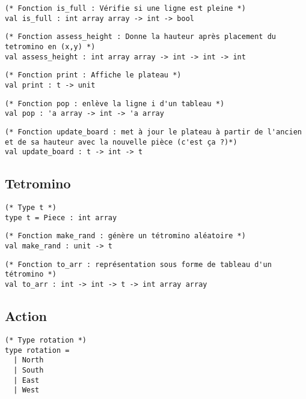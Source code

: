 \documentclass{article}
\begin{document}
\begin{lstlisting}[frame=L]
(* Fonction is_full : Vérifie si une ligne est pleine *)
val is_full : int array array -> int -> bool
\end{lstlisting}

\begin{lstlisting}[frame=L]
(* Fonction assess_height : Donne la hauteur après placement du tetromino en (x,y) *)
val assess_height : int array array -> int -> int -> int
\end{lstlisting}

\begin{lstlisting}[frame=L]
(* Fonction print : Affiche le plateau *)
val print : t -> unit
\end{lstlisting}

\begin{lstlisting}[frame=L]
(* Fonction pop : enlève la ligne i d'un tableau *)
val pop : 'a array -> int -> 'a array
\end{lstlisting}

\begin{lstlisting}[frame=L]
(* Fonction update_board : met à jour le plateau à partir de l'ancien et de sa hauteur avec la nouvelle pièce (c'est ça ?)*)
val update_board : t -> int -> t
\end{lstlisting}

\subsection{Tetromino}

\begin{lstlisting}[frame=L]
(* Type t *)
type t = Piece : int array
\end{lstlisting}

\begin{lstlisting}[frame=L]
(* Fonction make_rand : génère un tétromino aléatoire *)
val make_rand : unit -> t
\end{lstlisting}

\begin{lstlisting}[frame=L]
(* Fonction to_arr : représentation sous forme de tableau d'un tétromino *)
val to_arr : int -> int -> t -> int array array
\end{lstlisting}

\subsection{Action}

\begin{lstlisting}[frame=L]
(* Type rotation *)
type rotation =
  | North
  | South
  | East
  | West
\end{lstlisting}
\end{document}
